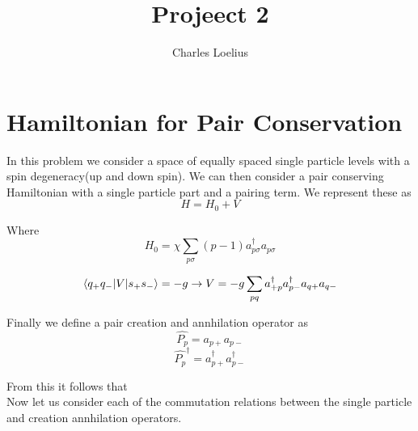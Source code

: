 \documentclass[11pt]{article} %
\title{Projeect 2}
\author{Charles Loelius}
\begin{document}
\maketitle

\section{Hamiltonian for Pair Conservation}

In this problem we consider a space of equally spaced single particle levels with a spin degeneracy(up and down spin). We can then consider a pair conserving Hamiltonian with a single particle part and a pairing term. We represent these as\\

\begin{equation}
H=H_0+V
\end{equation}

Where\\

\begin{equation}
H_0=\chi \sum_{p\sigma} \left(p-1\right)a_{p\sigma}^\dagger a_{p\sigma}
\end{equation}  

\begin{equation}
\braket{q_+q_-|V|s_+s_-} =-g \rightarrow V=-g\sum_{pq} a_{+p}^\dagger a_{p-}^\dagger a_{q+}a_{q-}
\end{equation}

Finally we define a pair creation and annhilation operator as\\
\begin{equation}\hat{P_p}=a_{p+} a_{p-}\end{equation}
\begin{equation}\hat{P_p}^\dagger=a_{p+}^\dagger a_{p-}^\dagger\end{equation}

From this it follows that\\

Now let us consider each of the commutation relations between the single particle and creation annhilation operators.\\
\end{document}
